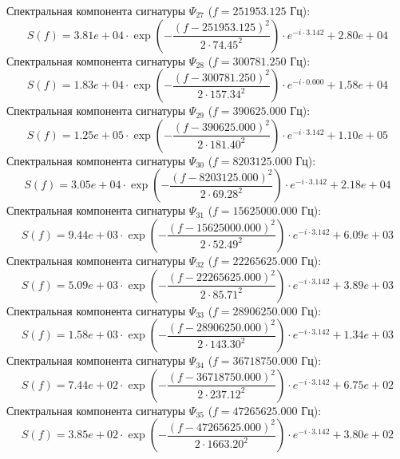 \documentclass[11pt,twocolumn]{article}
\begin{document}
Спектральная компонента сигнатуры $\Psi_{27}$ ($f = 251953.125$ Гц):
\begin{equation}
S(f) = 3.81e+04 \cdot \exp\left( -\frac{(f - 251953.125)^2}{2 \cdot 74.45^2} \right) \cdot e^{-i \cdot 3.142} + 2.80e+04
\end{equation}
Спектральная компонента сигнатуры $\Psi_{28}$ ($f = 300781.250$ Гц):
\begin{equation}
S(f) = 1.83e+04 \cdot \exp\left( -\frac{(f - 300781.250)^2}{2 \cdot 157.34^2} \right) \cdot e^{-i \cdot 0.000} + 1.58e+04
\end{equation}
Спектральная компонента сигнатуры $\Psi_{29}$ ($f = 390625.000$ Гц):
\begin{equation}
S(f) = 1.25e+05 \cdot \exp\left( -\frac{(f - 390625.000)^2}{2 \cdot 181.40^2} \right) \cdot e^{-i \cdot 3.142} + 1.10e+05
\end{equation}
Спектральная компонента сигнатуры $\Psi_{30}$ ($f = 8203125.000$ Гц):
\begin{equation}
S(f) = 3.05e+04 \cdot \exp\left( -\frac{(f - 8203125.000)^2}{2 \cdot 69.28^2} \right) \cdot e^{-i \cdot 3.142} + 2.18e+04
\end{equation}
Спектральная компонента сигнатуры $\Psi_{31}$ ($f = 15625000.000$ Гц):
\begin{equation}
S(f) = 9.44e+03 \cdot \exp\left( -\frac{(f - 15625000.000)^2}{2 \cdot 52.49^2} \right) \cdot e^{-i \cdot 3.142} + 6.09e+03
\end{equation}
Спектральная компонента сигнатуры $\Psi_{32}$ ($f = 22265625.000$ Гц):
\begin{equation}
S(f) = 5.09e+03 \cdot \exp\left( -\frac{(f - 22265625.000)^2}{2 \cdot 85.71^2} \right) \cdot e^{-i \cdot 3.142} + 3.89e+03
\end{equation}
Спектральная компонента сигнатуры $\Psi_{33}$ ($f = 28906250.000$ Гц):
\begin{equation}
S(f) = 1.58e+03 \cdot \exp\left( -\frac{(f - 28906250.000)^2}{2 \cdot 143.30^2} \right) \cdot e^{-i \cdot 3.142} + 1.34e+03
\end{equation}
Спектральная компонента сигнатуры $\Psi_{34}$ ($f = 36718750.000$ Гц):
\begin{equation}
S(f) = 7.44e+02 \cdot \exp\left( -\frac{(f - 36718750.000)^2}{2 \cdot 237.12^2} \right) \cdot e^{-i \cdot 3.142} + 6.75e+02
\end{equation}
Спектральная компонента сигнатуры $\Psi_{35}$ ($f = 47265625.000$ Гц):
\begin{equation}
S(f) = 3.85e+02 \cdot \exp\left( -\frac{(f - 47265625.000)^2}{2 \cdot 1663.20^2} \right) \cdot e^{-i \cdot 3.142} + 3.80e+02
\end{equation}
\end{document}
